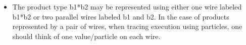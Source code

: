 \documentclass[preprint]{sigplanconf}
\begin{document}
\begin{itemize}
\item The product type {{b1*b2}} may be represented using either one wire
  labeled {{b1*b2}} or two parallel wires labeled {{b1}} and {{b2}}. In the
  case of products represented by a pair of wires, when tracing execution
  using particles, one should think of one value/particle on each wire.
\begin{multicols}{2}
\begin{center}
\end{center}
\begin{center}
\end{center}
\end{multicols}
\begin{multicols}{2}
\begin{center}
\end{center}
\begin{center}
\end{center}
\end{multicols}


\end{itemize}
\end{document}
